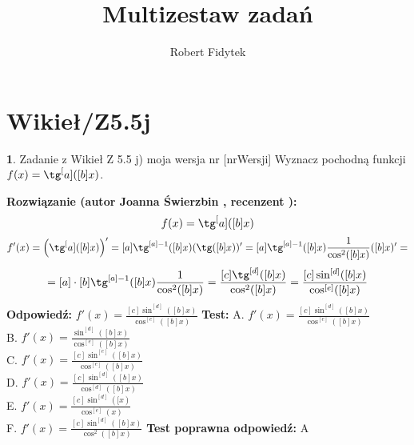 \documentclass[12pt, a4paper]{article}
\title{Multizestaw zadań}
\author{Robert Fidytek}
\date{}
\theoremstyle{definition} %
\newtheorem{zad}{}
\newcommand{\kategoria}[1]{\section{#1}} %
\newcommand{\zadStart}[1]{\begin{zad}#1\newline} %
\newcommand{\zadStop}{\end{zad}}   %
\newcommand{\rozwStart}[2]{\noindent \textbf{Rozwiązanie (autor #1 , recenzent #2): }\newline} %
\newcommand{\rozwStop}{\newline}                                            %
\newcommand{\odpStart}{\noindent \textbf{Odpowiedź:}\newline}    %
\newcommand{\odpStop}{\newline}                                             %
\newcommand{\testStart}{\noindent \textbf{Test:}\newline} %
\newcommand{\testStop}{\newline} %
\newcommand{\kluczStart}{\noindent \textbf{Test poprawna odpowiedź:}\newline} %
\newcommand{\kluczStop}{\newline} %
\begin{document}
\maketitle


\kategoria{Wikieł/Z5.5j}
\zadStart{Zadanie z Wikieł Z 5.5 j) moja wersja nr [nrWersji]}
Wyznacz pochodną funkcji \\ $f(x)=\tg^[a]([b]x)$.
\zadStop
\rozwStart{Joanna Świerzbin}{}
$$f(x)=\tg^[a]([b]x)$$
$$f'(x)= \left( \tg^[a]([b]x) \right)' = [a]\tg^{[a]-1}([b]x)(\tg([b]x))'=[a]\tg^{[a]-1}([b]x)\frac{1}{\cos^2([b]x)}([b]x)'=$$
$$=[a]\cdot[b]\tg^{[a]-1}([b]x)\frac{1}{\cos^2([b]x)}= \frac{[c]\tg^{[d]}([b]x)}{\cos^2([b]x)}= \frac{[c]\sin^{[d]}([b]x)}{\cos^{[e]}([b]x)}$$
\rozwStop
\odpStart
$ f'(x) = \frac{[c]\sin^{[d]}([b]x)}{\cos^{[e]}([b]x)} $
\odpStop
\testStart
A. $ f'(x) = \frac{[c]\sin^{[d]}([b]x)}{\cos^{[e]}([b]x)} $\\
B. $ f'(x) = \frac{\sin^{[d]}([b]x)}{\cos^{[e]}([b]x)} $ \\
C. $ f'(x) = \frac{[c]\sin^{[e]}([b]x)}{\cos^{[e]}([b]x)} $ \\
D. $ f'(x) = \frac{[c]\sin^{[d]}([b]x)}{\cos^{[d]}([b]x)} $\\
E. $ f'(x) = \frac{[c]\sin^{[d]}([x)}{\cos^{[e]}(x)} $\\
F. $ f'(x) = \frac{[c]\sin^{[d]}([b]x)}{\cos^{2}([b]x)} $
\testStop
\kluczStart
A
\kluczStop
\end{document}
